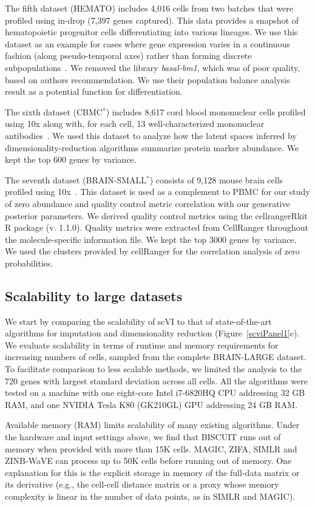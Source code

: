 The fifth dataset (HEMATO) includes 4,016 cells from two batches that were profiled using in-drop (7,397 genes captured). This data provides a snapshot of hematopoietic progenitor cells differentiating into various lineages. We use this dataset as an example for cases where gene expression varies in a continuous fashion (along pseudo-temporal axes) rather than forming discrete subpopulations~\cite{Tusi2018}. We removed the library \emph{basal-bm1}, which was of poor quality, based on authors recommendation. We use their population balance analysis~\cite{Weinreb2018} result as a potential function for differentiation. 

The sixth dataset (CBMC$^*$) includes 8,617 cord blood mononuclear cells profiled using 10x along with, for each cell, 13 well-characterized mononuclear antibodies~\cite{Stoeckius2017}. We used this dataset to analyze how the latent spaces inferred by dimensionality-reduction algorithms summarize protein marker abundance. We kept the top 600 genes by variance.

The seventh dataset (BRAIN-SMALL$^*$) consists of 9,128 mouse brain cells profiled using 10x~\cite{10x}. This dataset is used as a complement to PBMC for our study of zero abundance and quality control metric correlation with our generative posterior parameters. We derived quality control metrics using the cellrangerRkit R package (v. 1.1.0). Quality metrics were extracted from CellRanger throughout the molecule-specific information file. We kept the top 3000 genes by variance. We used the clusters provided by cellRanger for the correlation analysis of zero probabilities.


\subsection{Scalability to large datasets}
We start by comparing the scalability of scVI to that of state-of-the-art algorithms for imputation and dimensionality reduction (Figure~\ref{scviPanel1}c). We evaluate scalability in terms of runtime and memory requirements for increasing numbers of cells, sampled from the complete BRAIN-LARGE dataset. To facilitate comparison to less scalable methods, we limited the analysis to the 720 genes with largest standard deviation across all cells. All the algorithms were tested on a machine with one eight-core Intel i7-6820HQ CPU addressing 32 GB RAM, and one NVIDIA Tesla K80 (GK210GL) GPU addressing 24 GB RAM.

Available memory (RAM) limits scalability of many existing algorithms. Under the hardware and input settings above, we find that BISCUIT runs out of memory when provided with more than 15K cells. MAGIC, ZIFA, SIMLR and ZINB-WaVE can process up to 50K cells before running out of memory. One explanation for this is the explicit storage in memory of the full-data matrix or its derivative (e.g., the cell-cell distance matrix or a proxy whose memory complexity is linear in the number of data points, as in SIMLR and MAGIC).

